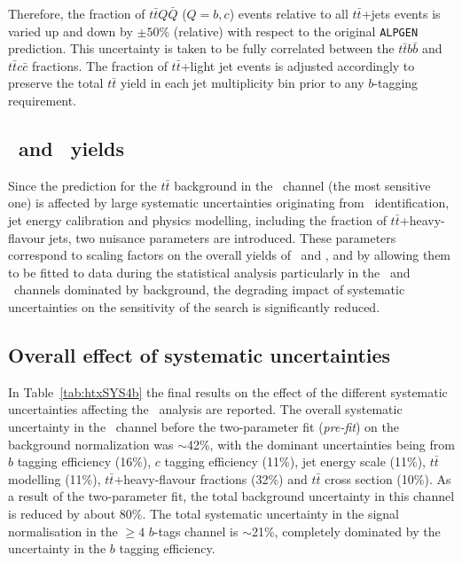 Therefore, the fraction of $t\bar{t}Q\bar{Q}$ ($Q=b,c$) events relative to all $t\bar{t}$+jets events
is varied up and down by $\pm 50\%$ (relative) with respect to the original \texttt{ALPGEN} prediction. 
This uncertainty is taken to be fully correlated between the $t\bar{t}b\bar{b}$ and $t\bar{t}c\bar{c}$ fractions.
The fraction of $t\bar{t}$+light jet events is adjusted accordingly to preserve the total $t\bar{t}$ yield in each jet multiplicity bin 
prior to any $b$-tagging requirement.


\subsection{\tthf\ and \ttlf\ yields}\label{sec:htxNuisance}

Since the prediction for the $t\bar{t}$ background
in the \chiv\ channel (the most sensitive one) is affected by large
systematic uncertainties originating from \bjet\ identification, jet energy calibration and
physics modelling, including the fraction of $t\bar{t}$+heavy-flavour jets, 
two nuisance parameters are introduced.
These parameters correspond to  scaling factors on the overall yields of 
\tthf\ and \ttlf, and by allowing them to be fitted to data during the statistical analysis
particularly in the \chii\ and \chiii\ channels dominated by background,
the degrading impact of systematic uncertainties on the sensitivity of the search
is significantly reduced. 

\subsection{Overall effect of systematic uncertainties}\label{sec:htxALLSYS}

In Table~\ref{tab:htxSYS4b} the final results on
the effect of the different systematic uncertainties affecting
the \htx\ analysis are reported.
The overall systematic uncertainty in the \chiv\ channel
before the two-parameter fit ({\it pre-fit})
on the background normalization was
$\sim$42\%, with the dominant uncertainties being from $b$ tagging efficiency (16\%),
$c$ tagging efficiency (11\%), jet energy scale (11\%), $t\bar{t}$ modelling (11\%), 
$t\bar{t}$+heavy-flavour fractions (32\%) and $t\bar{t}$ cross section (10\%).
As a result of the two-parameter fit, the total background uncertainty 
in this channel is reduced 
by about 80\%. The total  systematic uncertainty
in the signal normalisation in the $\geq 4$ $b$-tags channel is 
$\sim$21\%, completely dominated by the uncertainty in the $b$ tagging efficiency.



